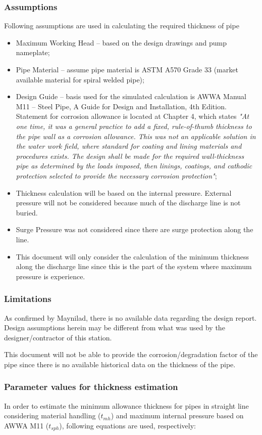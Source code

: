 \subsubsection{Assumptions}
Following assumptions are used in calculating the required thickness of pipe
\begin{itemize}
\item Maximum Working Head – based on the design drawings and pump nameplate;
\item Pipe Material – assume pipe material is ASTM A570 Grade 33 (market available material for spiral welded pipe);
\item Design Guide – basis used for the simulated calculation is AWWA  Manual M11 – Steel Pipe, A Guide for Design and Installation, 4th Edition. Statement for corrosion allowance is located at Chapter 4, which states \textit{"At one time, it was a general practice to add a fixed, rule-of-thumb thickness to the pipe wall as a corrosion allowance. This was not an applicable solution in the water work field, where standard for coating and lining materials and procedures exists. The design shall be made for the required wall-thickness pipe as determined by the loads imposed, then linings, coatings, and cathodic protection selected to provide the necessary corrosion protection"};
\item Thickness calculation will be based on the internal pressure. External pressure will not be considered because much of the discharge line is not buried.
\item 	Surge Pressure was not considered since there are surge protection along the line. 
\item 	This document will only consider the calculation of the minimum thickness along the discharge line since this is the part of the system where maximum pressure is experience.
\end{itemize}
\subsubsection{Limitations}
As confirmed by Maynilad, there is no available data regarding the design report. Design assumptions herein may be different from what was used by the designer/contractor of this station.

This document will not be able to provide the corrosion/degradation factor of the pipe since there is no available historical data on the thickness of the pipe.

\subsubsection{Parameter values for thickness estimation}
In order to estimate the minimum allowance thickness for pipes in straight line considering material handling ($t_{mh}$) and maximum internal pressure based on AWWA M11 ($t_{sph}$), following equations are used, respectively:

